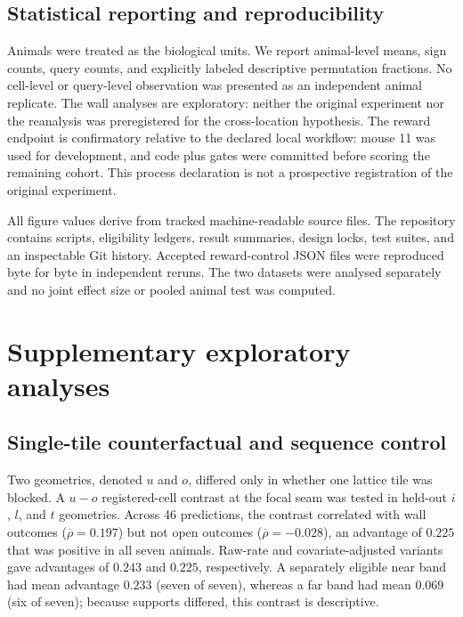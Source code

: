 \documentclass[10pt,twocolumn]{article}
\newcommand{\meanrho}{\overline{\rho}}
\begin{document}
\subsection{Statistical reporting and reproducibility}

Animals were treated as the biological units. We report animal-level means,
sign counts, query counts, and explicitly labeled descriptive permutation
fractions. No cell-level or query-level observation was presented as an
independent animal replicate. The wall analyses are exploratory: neither the
original experiment nor the reanalysis was preregistered for the cross-location
hypothesis. The reward endpoint is confirmatory relative to the declared local
workflow: mouse 11 was used for development, and code plus gates were committed
before scoring the remaining cohort. This process declaration is not a
prospective registration of the original experiment.

All figure values derive from tracked machine-readable source files. The
repository contains scripts, eligibility ledgers, result summaries, design
locks, test suites, and an inspectable Git history. Accepted reward-control
JSON files were reproduced byte for byte in independent reruns. The two
datasets were analysed separately and no joint effect size or pooled animal
test was computed.

\section{Supplementary exploratory analyses}
\label{sec:supplementary}

\subsection{Single-tile counterfactual and sequence control}

Two geometries, denoted \(u\) and \(o\), differed only in whether one lattice
tile was blocked. A \(u-o\) registered-cell contrast at the focal seam was
tested in held-out \(i\), \(l\), and \(t\) geometries. Across 46 predictions,
the contrast correlated with wall outcomes (\(\meanrho=0.197\)) but not open
outcomes (\(\meanrho=-0.028\)), an advantage of \(0.225\) that was positive in
all seven animals. Raw-rate and covariate-adjusted variants gave advantages of
\(0.243\) and \(0.225\), respectively. A separately eligible near band had mean
advantage \(0.233\) (seven of seven), whereas a far band had mean \(0.069\) (six
of seven); because supports differed, this contrast is descriptive.
\end{document}
